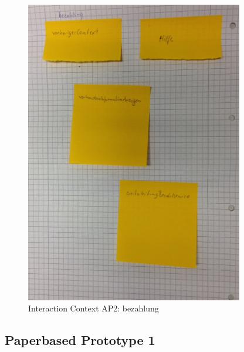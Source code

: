 \begin{figure}[H]
\centering
\includegraphics[angle=90, width=0.85\textwidth] {./images/abstract/version2/bezahlung.JPG}
\caption{Interaction Context AP2: bezahlung}
\label{interfaceContents52}
\end{figure}

\newpage
\subsection{Paperbased Prototype 1}

